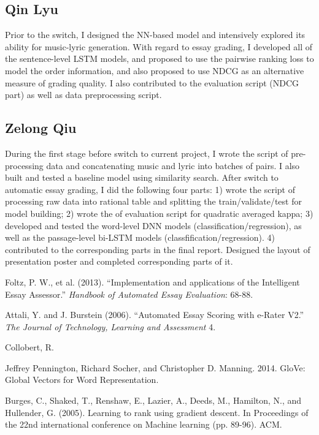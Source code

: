 \documentclass[10pt,psamsfonts]{amsart}
\theoremstyle{definition}
\theoremstyle{remark}
\numberwithin{equation}{section}
\begin{document}
\subsection*{Qin Lyu}

Prior to the switch, I designed the NN-based model and intensively explored its ability for music-lyric generation. With regard to essay grading, I developed all of the sentence-level LSTM models, and proposed to use the pairwise ranking loss to model the order information, and also proposed to use NDCG as an alternative measure of grading quality. I also contributed to the evaluation script (NDCG part) as well as data preprocessing script.

\subsection*{Zelong Qiu}
During the first stage before switch to current project, I wrote the script of pre-processing data and concatenating music and lyric into batches of pairs. I also built and tested a baseline model using similarity search. After switch to automatic essay grading, I did the following four parts: 1) wrote the script of processing raw data into rational table and splitting the train/validate/test for model building; 2) wrote the of evaluation script for quadratic averaged kappa; 3) developed and tested the word-level DNN models (classification/regression), as well as the passage-level bi-LSTM models (classfification/regression). 4) contributed to the corresponding parts in the final report. Designed the layout of presentation poster and completed corresponding parts of it.

\begin{thebibliography}{99}
Foltz, P. W., et al. (2013). ``Implementation and applications of the Intelligent Essay Assessor.'' {\em Handbook of Automated Essay Evaluation}: 68-88.

Attali, Y. and J. Burstein (2006). ``Automated Essay Scoring with e-Rater V2.'' {\em The Journal of Technology, Learning and Assessment} 4.

Collobert, R.

Jeffrey Pennington, Richard Socher, and Christopher D. Manning. 2014. GloVe: Global Vectors for Word Representation.

Burges, C., Shaked, T., Renshaw, E., Lazier, A., Deeds, M., Hamilton, N., and Hullender, G. (2005). Learning to rank using gradient descent. In Proceedings of the 22nd international conference on Machine learning (pp. 89-96). ACM.


\end{thebibliography}
\end{document}
